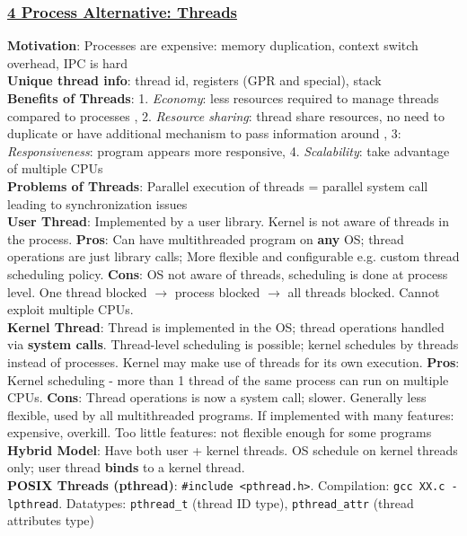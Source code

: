 \documentclass{article}
\begin{document}
\begin{multicols*}{3}
\subsubsection*{\underline{4 Process Alternative: Threads}}
\textbf{Motivation}: Processes are expensive: memory duplication, context switch overhead, IPC is hard\\ 
\textbf{Unique thread info}: thread id, registers (GPR and special), stack \\
\textbf{Benefits of Threads}: 1. \textit{Economy}: less resources required to manage threads compared to processes , 2. \textit{Resource sharing}: thread share resources, no need to duplicate or have additional mechanism to pass information around , 3: \textit{Responsiveness}: program appears more responsive, 4. \textit{Scalability}: take advantage of multiple CPUs \\ 
\textbf{Problems of Threads}: Parallel execution of threads = parallel system call leading to synchronization issues \\
\textbf{User Thread}: Implemented by a user library. Kernel is not aware of threads in the process. \textbf{Pros}: Can have multithreaded program on \textbf{any} OS; thread operations are just library calls; More flexible and configurable e.g. custom thread scheduling policy. \textbf{Cons}: OS not aware of threads, scheduling is done at process level. One thread blocked $\to$ process blocked $\to$ all threads blocked. Cannot exploit multiple CPUs.  \\
\textbf{Kernel Thread}: Thread is implemented in the OS; thread operations handled via \textbf{system calls}. Thread-level scheduling is possible; kernel schedules by threads instead of processes. Kernel may make use of threads for its own execution. \textbf{Pros}: Kernel scheduling - more than 1 thread of the same process can run on multiple CPUs. \textbf{Cons}: Thread operations is now a system call; slower. Generally less flexible, used by all multithreaded programs. If implemented with many features: expensive, overkill. Too little features: not flexible enough for some programs \\
\textbf{Hybrid Model}: Have both user + kernel threads. OS schedule on kernel threads only; user thread \textbf{binds} to a kernel thread. \\
\textbf{POSIX Threads (pthread)}: \texttt{\#include <pthread.h>}. Compilation: \texttt{gcc XX.c -lpthread}. Datatypes: \texttt{pthread\_t} (thread ID type), \texttt{pthread\_attr} (thread attributes type) \\

\end{multicols*}
\end{document}
